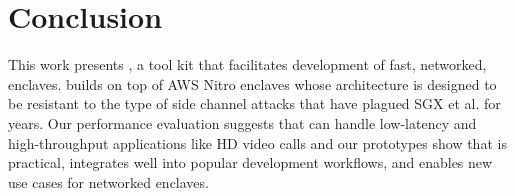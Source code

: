 \section{Conclusion}%
\label{sec:conclusion}

This work presents \tool{}, a tool kit that facilitates development of
fast, networked, enclaves.  \Tool{} builds on top of AWS Nitro enclaves whose
architecture is designed to be resistant to the type of side channel attacks
that have plagued SGX et al. for years.  Our performance evaluation suggests
that \tool{} can handle low-latency and high-throughput applications like HD
video calls and our prototypes show that \tool{} is practical, integrates well
into popular development workflows, and enables new use cases for networked
enclaves.
